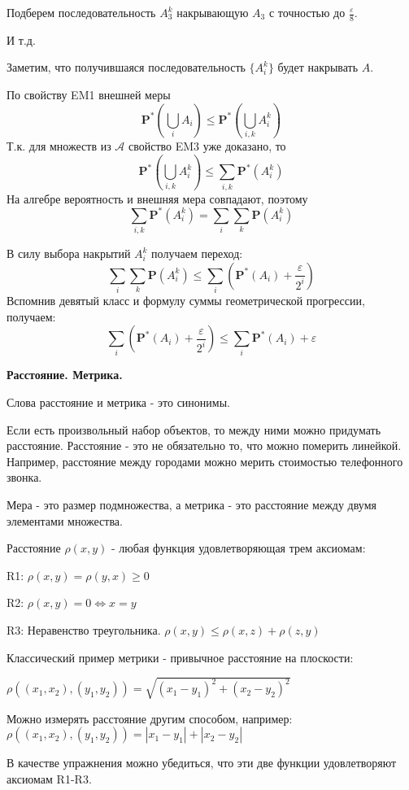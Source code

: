 {Подберем последовательность $A_{3}^{k}$ накрывающую $A_{3}$ с
точностью до $\frac{\varepsilon}{8}$.

И т.д.

Заметим, что получившаяся последовательность $\{A_{i}^{k}\}$ будет
накрывать $A$.

По свойству EM1 внешней меры
$$
\mathbf{P^{*}}(\bigcup_{i}A_{i})\leq
\mathbf{P^{*}}(\bigcup_{i,k}A_{i}^{k})
$$
Т.к. для множеств из $\mathcal{A}$ свойство EM3 уже доказано, то
$$
\mathbf{P^{*}}(\bigcup_{i,k}A_{i}^{k}) \leq \sum_{i,k}
\mathbf{P^{*}}(A_{i}^{k})
$$
На алгебре вероятность и внешняя мера совпадают, поэтому
$$
\sum_{i,k} \mathbf{P^{*}}(A_{i}^{k})=\sum_{i} \sum_{k}
\mathbf{P}(A_{i}^{k})
$$

В силу выбора накрытий $A_{i}^{k}$ получаем переход:
$$
\sum_{i} \sum_{k} \mathbf{P}(A_{i}^{k})
\leq
\sum_{i}
(\mathbf{P^{*}}(A_{i})+\frac{\varepsilon}{2^{i}})
$$
Вспомнив девятый класс и формулу суммы геометрической прогрессии,
получаем:
$$
\sum_{i} (\mathbf{P^{*}}(A_{i})+\frac{\varepsilon}{2^{i}})
\leq
\sum_{i} \mathbf{P^{*}}(A_{i}) + \varepsilon
$$


\textbf{Расстояние. Метрика.}

Слова расстояние и метрика - это синонимы.

Если есть произвольный набор объектов, то между ними можно
придумать расстояние. Расстояние - это не обязательно то, что
можно померить линейкой. Например, расстояние между городами можно
мерить стоимостью телефонного звонка.

Мера - это размер подмножества, а метрика - это расстояние между
двумя элементами множества.

\begin{mydef}
Расстояние $\rho(x,y)$ - любая функция удовлетворяющая трем
аксиомам:

R1: $\rho(x,y)=\rho(y,x)\geq 0$

R2: $\rho(x,y)=0 \Leftrightarrow x=y$

R3: Неравенство треугольника. $\rho(x,y) \leq \rho(x,z)+\rho(z,y)$
\end{mydef}
Классический пример метрики - привычное расстояние на плоскости:

$\rho((x_{1},x_{2}),(y_{1},y_{2}))=\sqrt{(x_{1}-y_{1})^{2}+(x_{2}-y_{2})^{2}}$

Можно измерять расстояние другим способом, например:
$\rho((x_{1},x_{2}),(y_{1},y_{2}))=|x_{1}-y_{1}|+|x_{2}-y_{2}|$

В качестве упражнения можно убедиться, что эти две функции
удовлетворяют аксиомам R1-R3.

}
